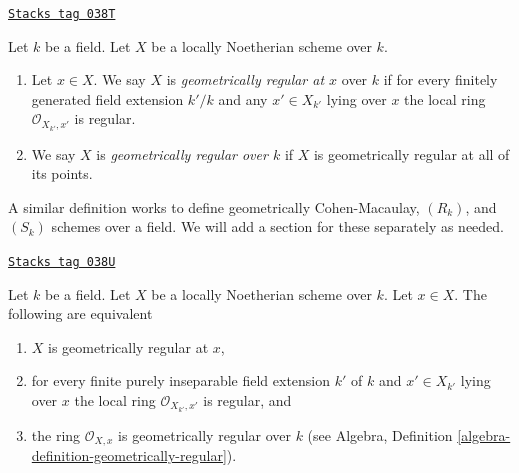 \begin{definition}
\label{varieties-definition-geometrically-regular}
\href{https://stacks.math.columbia.edu/tag/038T}{\texttt{Stacks tag 038T}}

Let $k$ be a field. Let $X$ be a locally Noetherian scheme over $k$.
\begin{enumerate}
\item Let $x \in X$. We say $X$ is {\it geometrically regular at $x$}
over $k$ if for every finitely generated field extension $k'/k$
and any $x' \in X_{k'}$ lying over $x$ the local ring
$\mathcal{O}_{X_{k'}, x'}$ is regular.
\item We say $X$ is {\it geometrically regular over $k$} if
$X$ is geometrically regular at all of its points.
\end{enumerate}
\end{definition}

A similar definition works to define geometrically
Cohen-Macaulay, $(R_k)$, and $(S_k)$ schemes over a field.
We will add a section for these separately as needed.

\begin{lemma}
\label{varieties-lemma-geometrically-regular-at-point}
\href{https://stacks.math.columbia.edu/tag/038U}{\texttt{Stacks tag 038U}}

Let $k$ be a field.
Let $X$ be a locally Noetherian scheme over $k$.
Let $x \in X$.
The following are equivalent
\begin{enumerate}
\item $X$ is geometrically regular at $x$,
\item for every finite purely inseparable field extension $k'$ of $k$
and $x' \in X_{k'}$ lying over $x$ the local ring
$\mathcal{O}_{X_{k'}, x'}$ is regular, and
\item the ring $\mathcal{O}_{X, x}$ is geometrically
regular over $k$ (see
Algebra, Definition \ref{algebra-definition-geometrically-regular}).
\end{enumerate}
\end{lemma}

